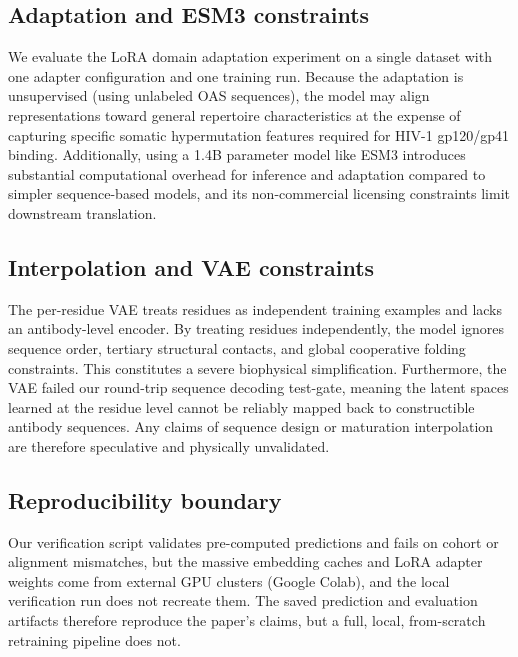 \subsection{Adaptation and ESM3 constraints}
We evaluate the LoRA domain adaptation experiment on a single dataset with one
adapter configuration and one training run. Because the adaptation is
unsupervised (using unlabeled OAS sequences), the model may align
representations toward general repertoire characteristics at the expense of
capturing specific somatic hypermutation features required for HIV-1 gp120/gp41
binding. Additionally, using a 1.4B parameter model like ESM3 introduces
substantial computational overhead for inference and adaptation compared to
simpler sequence-based models, and its non-commercial licensing constraints
limit downstream translation.

\subsection{Interpolation and VAE constraints}
The per-residue VAE treats residues as independent training examples and lacks
an antibody-level encoder. By treating residues independently, the model ignores
sequence order, tertiary structural contacts, and global cooperative folding
constraints. This constitutes a severe biophysical simplification. Furthermore,
the VAE failed our round-trip sequence decoding test-gate, meaning the latent
spaces learned at the residue level cannot be reliably mapped back to
constructible antibody sequences. Any claims of sequence design or maturation
interpolation are therefore speculative and physically unvalidated.

\subsection{Reproducibility boundary}
Our verification script validates pre-computed predictions and fails on cohort
or alignment mismatches, but the massive embedding caches and LoRA adapter
weights come from external GPU clusters (Google Colab), and the local
verification run does not recreate them. The saved prediction and evaluation
artifacts therefore reproduce the paper's claims, but a full, local,
from-scratch retraining pipeline does not.
